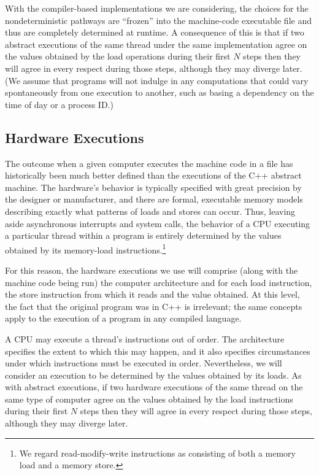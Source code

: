 With the compiler-based implementations we are considering,
the choices for the nondeterministic pathways are ``frozen'' into the
machine-code executable file and thus are completely determined
at runtime.
A consequence of this is that if two abstract executions of the same
thread under the same implementation agree on the values obtained by
the load operations during their first $N$ steps then they will agree
in every respect during those steps, although they may diverge later.
(We assume that programs will not indulge in any computations that
could vary spontaneously from one execution to another,
such as basing a dependency on the time of day or a process ID.)

\subsection{Hardware Executions}
\label{sec:Hardware Executions}

The outcome when a given computer executes the machine code in a file
has historically been much better defined than the executions of the
C++ abstract machine.
The hardware's behavior is typically specified with great precision by
the designer or manufacturer, and there are formal, executable memory models
describing exactly what patterns of loads and stores can occur.
Thus, leaving aside asynchronous interrupts and system
calls, the behavior of a CPU executing a particular thread within a
program is entirely determined by the values obtained by its
memory-load instructions.\footnote{
	We regard read-modify-write instructions as consisting of both a
	memory load and a memory store.}

For this reason, the hardware executions we use will comprise (along
with the machine code being run) the computer architecture and for each
load instruction, the store instruction from which it reads and the
value obtained.
At this level, the fact that the original program was in C++ is
irrelevant; the same concepts apply to the execution of a program in
any compiled language.

A CPU may execute a thread's instructions out of order.
The architecture specifies the extent to which this may happen, and it
also specifies circumstances under which instructions
must be executed in order.
Nevertheless, we will consider an execution to be determined by the
values obtained by its loads.
As with abstract executions, if two hardware executions of the same
thread on the same type of computer agree on the values obtained by
the load instructions during their first $N$ steps then they will
agree in every respect during those steps, although they may diverge
later.

